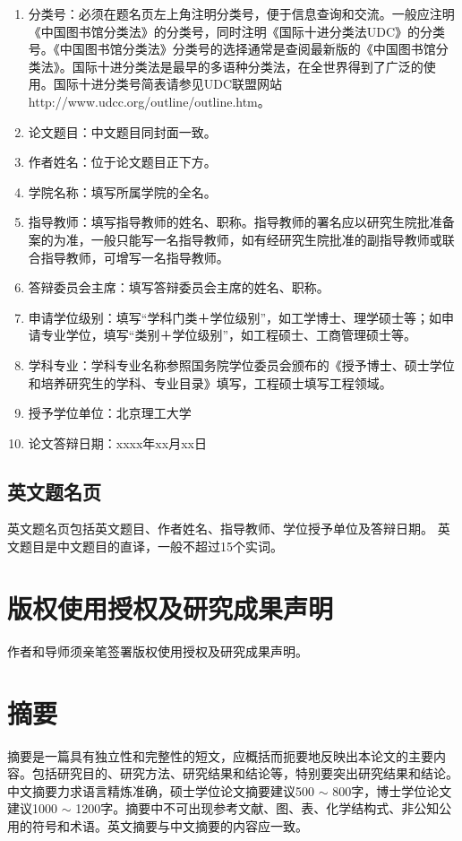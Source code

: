 \begin{enumerate}
\item 分类号：必须在题名页左上角注明分类号，便于信息查询和交流。一般应注明《中国图书馆分类法》的分类号，同时注明《国际十进分类法UDC》的分类号。《中国图书馆分类法》分类号的选择通常是查阅最新版的《中国图书馆分类法》。国际十进分类法是最早的多语种分类法，在全世界得到了广泛的使用。国际十进分类号简表请参见UDC联盟网站http://www.udcc.org/outline/outline.htm。
\item 论文题目：中文题目同封面一致。
\item 作者姓名：位于论文题目正下方。
\item 学院名称：填写所属学院的全名。
\item 指导教师：填写指导教师的姓名、职称。指导教师的署名应以研究生院批准备案的为准，一般只能写一名指导教师，如有经研究生院批准的副指导教师或联合指导教师，可增写一名指导教师。
\item 答辩委员会主席：填写答辩委员会主席的姓名、职称。
\item 申请学位级别：填写“学科门类＋学位级别”，如工学博士、理学硕士等；如申请专业学位，填写“类别＋学位级别”，如工程硕士、工商管理硕士等。
\item 学科专业：学科专业名称参照国务院学位委员会颁布的《授予博士、硕士学位和培养研究生的学科、专业目录》填写，工程硕士填写工程领域。
\item 授予学位单位：北京理工大学
\item 论文答辩日期：xxxx年xx月xx日
\end{enumerate}

\subsection{英文题名页}
英文题名页包括英文题目、作者姓名、指导教师、学位授予单位及答辩日期。
英文题目是中文题目的直译，一般不超过15个实词。

\section{版权使用授权及研究成果声明}
作者和导师须亲笔签署版权使用授权及研究成果声明。

\section{摘要}
摘要是一篇具有独立性和完整性的短文，应概括而扼要地反映出本论文的主要内容。包括研究目的、研究方法、研究结果和结论等，特别要突出研究结果和结论。中文摘要力求语言精炼准确，硕士学位论文摘要建议500 $\sim$ 800字，博士学位论文建议1000 $\sim$ 1200字。摘要中不可出现参考文献、图、表、化学结构式、非公知公用的符号和术语。英文摘要与中文摘要的内容应一致。

